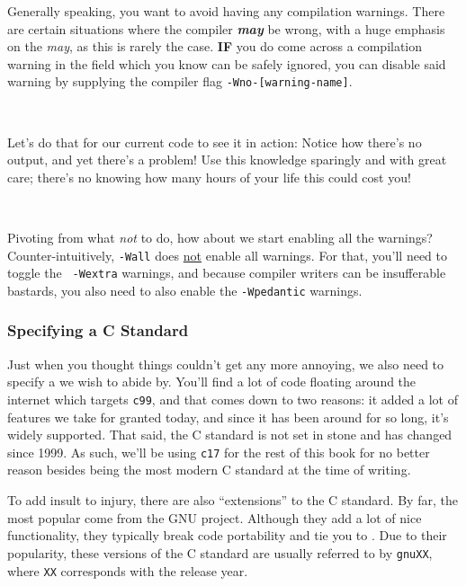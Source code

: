 Generally speaking, you want to avoid having any compilation warnings.
There are certain situations where the compiler \textbf{\emph{may}} be
wrong, with a huge emphasis on the \emph{may}, as this is rarely the
case.  \textbf{IF} you do come across a compilation warning in the field
which you know can be safely ignored, you can disable said warning by
supplying the compiler flag \texttt{-Wno-[warning-name]}.

\

\noindent
Let's do that for our current code to see it in action:
\noindent
Notice how there's no output, and yet there's a problem!  Use this
knowledge sparingly and with great care; there's no knowing how many
hours of your life this could cost you!

\

\noindent
Pivoting from what \emph{not} to do, how about we start enabling all the
warnings?  Counter-intuitively, \texttt{-Wall} does \underline{not}
enable all warnings.  For that, you'll need to toggle the \texttt{%
-Wextra} warnings, and because compiler writers can be insufferable
bastards, you also need to also enable the \texttt{-Wpedantic} warnings.

\subsubsection{Specifying a C Standard}

Just when you thought things couldn't get any more annoying, we also
need to specify a  we wish to abide by.  You'll find a
lot of code floating around the internet which targets \texttt{c99}, and
that comes down to two reasons: it added a lot of features we take for
granted today, and since it has been around for so long, it's widely
supported.  That said, the C standard is not set in stone and has
changed since 1999.  As such, we'll be using \texttt{c17} for the rest
of this book for no better reason besides being the most modern C
standard at the time of writing.

To add insult to injury, there are also \enquote{extensions} to the C
standard.  By far, the most popular come from the GNU project.  Although
they add a lot of nice functionality, they typically break code
portability and tie you to .  Due to their popularity,
these versions of the C standard are usually referred to by
\texttt{gnuXX}, where \texttt{XX} corresponds with the release year.

